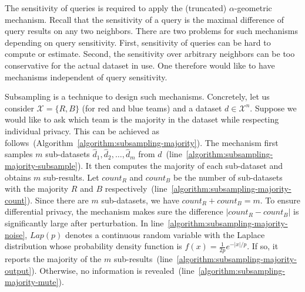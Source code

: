 
The sensitivity of queries is required to apply the (truncated)
$\alpha$-geometric mechanism. Recall that the sensitivity of a query
is the maximal difference of query results on any two neighbors. There are
two problems for such mechanisms depending on query sensitivity. First, 
sensitivity of queries can be hard to compute or estimate. Second,
the sensitivity over arbitrary neighbors can be too conservative for
the actual dataset in use. One therefore would like to have
mechanisms independent of query sensitivity.

Subsampling is a technique to design such mechanisms. Concretely, let
us consider $\mathcal{X} = \{ R, B \}$ (for red and blue teams) and a
dataset $d \in \mathcal{X}^n$. Suppose we would like to ask which team
is the majority in the dataset while respecting individual
privacy. This can be achieved as
follows~(Algorithm~\ref{algorithm:subsampling-majority}). The
mechanism first samples $m$ 
sub-datasets $\hat{d}_1, \hat{d}_2, \ldots, \hat{d}_m$ from
$d$~(line~\ref{algorithm:subsampling-majority-subsample}). 
It then computes the majority of each sub-dataset and obtains $m$
sub-results. Let $\mathit{count}_R$ and $\mathit{count}_B$ be the
number of sub-datasets with the majority $R$ and $B$
respectively~(line~\ref{algorithm:subsampling-majority-count}). 
Since there are $m$ sub-datasets, we have
$\mathit{count}_R + \mathit{count}_B = m$. To ensure differential
privacy, the mechanism makes sure the difference $| \mathit{count}_R -
\mathit{count}_B |$ is significantly large after perturbation. In
line~\ref{algorithm:subsampling-majority-noise},
$\mathit{Lap}(p)$ denotes a continuous random
variable with the Laplace distribution whose probability density
function is $f(x) = \frac{1}{2p}e^{-|x|/p}$.
If so,
it reports the majority of the $m$
sub-results~(line~\ref{algorithm:subsampling-majority-output}). Otherwise,
no information is
revealed~(line~\ref{algorithm:subsampling-majority-mute}).

